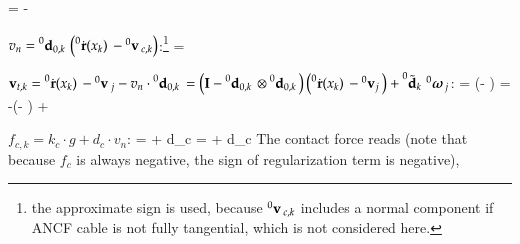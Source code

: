   \be
     =  -  
  \ee
  \item $v_n = \prescript{0}{}{\mathbf{d}_{0,k}}\, \left( \prescript{0}{}{\dot {\mathbf{r}}(x_{k})}\, - \prescript{0}{}{\mathbf{v}}\,_{c,k} \right)$:\footnote{the approximate sign is used, because $\prescript{0}{}{\mathbf{v}}\,_{c,k}$ includes a normal component if ANCF cable is not fully tangential, which is not considered here.}
  \be
     = \ANCFdkO {} 
    \approx %
        \ANCFdkOtp \diffANCFdk
  \ee
  \item $\mathbf{v}_{t,k} = \prescript{0}{}{\dot {\mathbf{r}}(x_{k})}\, - \prescript{0}{}{\mathbf{v}}\,_j - v_n \cdot \prescript{0}{}{\mathbf{d}_{0,k}}\, =
  \left(\mathbf{I} - \prescript{0}{}{\mathbf{d}_{0,k}}\, \otimes \prescript{0}{}{\mathbf{d}_{0,k}}\, \right) \left( \prescript{0}{}{\dot {\mathbf{r}}(x_{k})}\, - \prescript{0}{}{\mathbf{v}_j}\, \right) 
      +\prescript{0}{}{\tilde {\mathbf{d}}_k}\, \prescript{0}{}{\mbox{\boldmath $\omega$ \unboldmath}\!\!}\,_{j} $:
  \be
     = \left(\Im - \ANCFdkO \otimes \ANCFdkO \right) 
  \ee
  \be
     = -\left(\Im - \ANCFdkO \otimes \ANCFdkO \right)  +  
  \ee
  \item $f_{c,k} = k_c \cdot g  + d_c \cdot v_n$:
  \be 
     =   + d_c \cdot {}
    \approx {}
  \ee
  \be 
     =   + d_c \cdot {}
    \approx {}
  \ee
  \be 
  \ee  
  \be 
  \ee  
\ei
The contact force reads (note that because $f_c$ is always negative, the sign of regularization term is negative),
